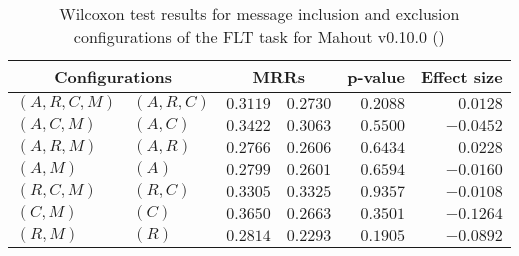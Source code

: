 
\begin{table}
\begin{spacing}{1.2}
\centering
\caption{Wilcoxon test results for message inclusion and exclusion configurations of the FLT task for Mahout v0.10.0 (\ctwo)}
\label{table:versus-wilcox-mahout-flt-message}
\begin{tabular}{ll|rr|rr}
\toprule
      \multicolumn{2}{c|}{Configurations} &                \multicolumn{2}{c|}{MRRs} &             p-value & Effect size \\
\midrule
 $(A,R,C,M)$ &  $(A,R,C)$ &  $\bm{0.3119}$ &       $0.2730$ & $0.2088$ &    $0.0128$ \\
   $(A,C,M)$ &    $(A,C)$ &  $\bm{0.3422}$ &       $0.3063$ & $0.5500$ &   $-0.0452$ \\
   $(A,R,M)$ &    $(A,R)$ &  $\bm{0.2766}$ &       $0.2606$ & $0.6434$ &    $0.0228$ \\
     $(A,M)$ &      $(A)$ &  $\bm{0.2799}$ &       $0.2601$ & $0.6594$ &   $-0.0160$ \\
   $(R,C,M)$ &    $(R,C)$ &       $0.3305$ &  $\bm{0.3325}$ & $0.9357$ &   $-0.0108$ \\
     $(C,M)$ &      $(C)$ &  $\bm{0.3650}$ &       $0.2663$ & $0.3501$ &   $-0.1264$ \\
     $(R,M)$ &      $(R)$ &  $\bm{0.2814}$ &       $0.2293$ & $0.1905$ &   $-0.0892$ \\
\bottomrule
\end{tabular}

\end{spacing}
\end{table}

